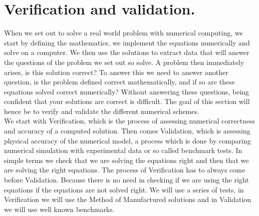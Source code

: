 \chapter{Verification and validation. }
When we set out to solve a real world problem with numerical computing, we start by defining the mathematics, we implement the equations numerically and solve on a computer. We then use the solutions to extract data that will answer the questions of the problem we set out so solve. A problem then immediately arises, is this solution correct? To answer this we need to answer another question, is the problem defined correct mathematically, and if so are these equations solved correct numerically? Without answering these questions, being confident that your solutions are correct is difficult. \cite{Selin2014} The goal of this section will hence be to verify and validate the different numerical schemes. \\
We start with Verification, which is the process of assessing numerical correctness and accuracy of a computed solution. Then comes Validation, which is assessing physical accuracy of the numerical model, a process which is done by comparing numerical simulation with experimental data or so called benchmark tests. In simple terms we check that we are solving the equations right and then that we are solving the right equations. The process of Verification has to always come before Validation. Because there is no need in checking if we are using the right equations if the equations are not solved right. We will use a series of tests, in Verification we will use the Method of Manufactured solutions and in Validation we will use well known benchmarks.


